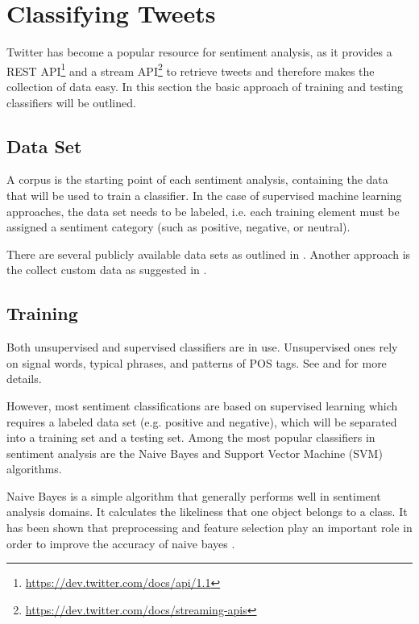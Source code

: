 \documentclass{acm_proc_article-sp}
\begin{document}
\section{Classifying Tweets} \label{classification}

Twitter has become a
popular resource for sentiment analysis, as it provides a REST
API\footnote{\url{https://dev.twitter.com/docs/api/1.1}} and a stream
API\footnote{\url{https://dev.twitter.com/docs/streaming-apis}} to retrieve tweets
and therefore makes the collection of data easy.  In this section the basic
approach of training and testing classifiers will be outlined.


\subsection{Data Set}

A corpus is the starting point of each sentiment
analysis, containing the data that will be used to train a classifier.
In the case of supervised machine
learning approaches, the data set needs to be labeled, i.e. each training element
must be assigned a sentiment category (such as positive, negative, or neutral).

There are several publicly available data sets as outlined in \cite{kouloumpis2011twitter}.
Another approach is the collect custom data  as suggested in \cite{pak2010twitter}.


\subsection{Training}

Both unsupervised and
supervised classifiers are in use. Unsupervised ones rely on signal words, typical
phrases, and patterns of POS tags. See
\cite{liu2010sentimentanalysis} and \cite{pang2008opinion} for more details.

However, most sentiment classifications are based on supervised learning which
requires a labeled data set (e.g. positive and negative), which will be
separated into a training set and a testing set. Among the most popular
classifiers in sentiment analysis are the Naive Bayes and Support Vector Machine (SVM) algorithms. 

Naive Bayes is a simple algorithm that generally performs well in sentiment
analysis domains. It calculates the likeliness that one object belongs to a
class. It has been shown that preprocessing and feature selection play an
important role in order to improve the accuracy of naive bayes \cite{ye2009sentiment, ting2011naive}.
\end{document}
